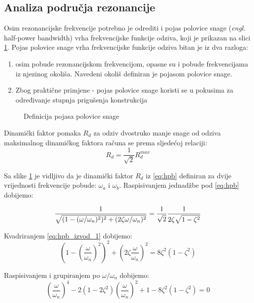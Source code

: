 \subsection{Analiza područja rezonancije}
Osim rezonancijske frekvencije potrebno je odrediti i pojas polovice snage
(\textit{engl.} half-power bandwidth) vrha frekvencijske funkcije odziva, 
koji je prikazan na slici \ref{fig:hpb}. Pojas polovice snage vrha frekvencijske funkcije
odziva bitan je iz dva razloga:
\begin{enumerate}
    \item osim pobude rezonancijskom frekvencijom, opasne su i pobude frekvencijama iz
        njezinog okoliša. Navedeni okoliš definiran je pojasom polovice snage.
    \item Zbog praktične primjene - pojas polovice snage koristi se u pokusima
        za određivanje stupnja prigušenja konstrukcija
\end{enumerate}
\begin{figure}[H]
    
    \caption{Definicija pojasa polovice snage}
    \label{fig:hpb}
\end{figure}
Dinamički faktor pomaka $R_d$ za odziv dvostruko manje snage od odziva maksimalnog
dinamičkog faktora računa se prema sljedećoj relaciji:
\begin{equation}\label{eq:hpb}
    R_d = \frac{1}{\sqrt{2}}R_d^{max}
\end{equation}

Sa slike \ref{fig:hpb} je vidljivo da je dinamički faktor $R_d$ iz \eqref{eq:hpb} definiran za
dvije vrijednosti frekvencije pobude: $\omega_a$ i $\omega_b$. Raspisivanjem
jednadžbe pod \eqref{eq:hpb} dobijemo:

\begin{equation}\label{eq:hpb_izvod_1}
        \frac{1}{\sqrt{(1-(\omega/\omega_n)^2)^2+(2\zeta\omega/\omega_n)^2}}=
            \frac{1}{\sqrt{2}}\frac{1}{2\zeta\sqrt{1-\zeta^2}}\\
\end{equation}

Kvadriranjem \eqref{eq:hpb_izvod_1} dobijemo:
\begin{equation}\label{eq:hpb_izvod_2}
    \left(1-\left(\frac{\omega}{\omega_n}\right)^2\right)^2
    +\left(2\zeta\frac{\omega}{\omega_n}\right)^2 =
    8\zeta^2(1-\zeta^2)
\end{equation}

Raspisivanjem i grupiranjem po $\omega/\omega_n$ dobijemo:
\begin{equation}\label{eq:hpb_izvod_3}
    \left(\frac{\omega}{\omega_n}\right)^4
    -2(1-2\zeta^2)\left(\frac{\omega}{\omega_n}\right)^2
    +1-8\zeta^2(1-\zeta^2)=0
\end{equation}

